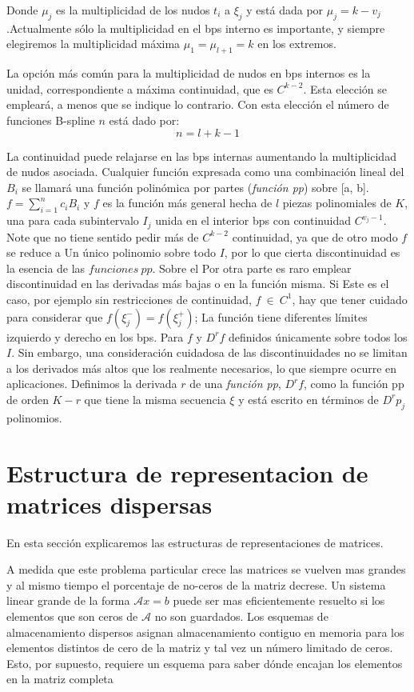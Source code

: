 \documentclass[a4paper,openright,12pt, oneside]{book}
\begin{document}
Donde $ \mu_j $ es la multiplicidad de los nudos $ t_i $ a $ \xi_j $ y est\'a dada por $ \mu_j = k - v_j $ .Actualmente s\'olo la multiplicidad en el bps interno es importante, y siempre elegiremos la multiplicidad m\'axima $ \mu_1 = \mu_ {l + 1} = k $ en los extremos.

La opci\'on m\'as com\'un para la multiplicidad de nudos en bps internos es la unidad, correspondiente a
m\'axima continuidad, que es $ C ^ {k-2} $. Esta elecci\'on se emplear\'a, a menos que se indique lo contrario. Con esta elecci\'on el n\'umero de funciones B-spline $n$ est\'a dado por:
$$ n = l + k - 1 $$

La continuidad puede relajarse en las bps internas aumentando la multiplicidad de nudos asociada.
Cualquier funci\'on expresada como una combinaci\'on lineal del $B_i$ se llamar\'a una funci\'on polin\'omica por partes (\textit{funci\'on pp}) sobre [a, b].
$f = \sum_{i=1}^n c_i B_i$
y $ f $ es la funci\'on m\'as general hecha de $l$ piezas polinomiales de
$ K $, una para cada subintervalo $ I_j $ unida en el interior bps con continuidad $ C ^ {v_j-1} $. Note que no tiene sentido pedir m\'as de $ C ^ {k-2} $ continuidad, ya que de otro modo $f$ se reduce a
Un \'unico polinomio sobre todo $I$, por lo que cierta discontinuidad es la esencia de las $funciones\ pp$. Sobre el
Por otra parte es raro emplear discontinuidad en las derivadas m\'as bajas o en la funci\'on misma. Si
Este es el caso, por ejemplo sin restricciones de continuidad, $ f\ \in\ C^1 $, hay que tener cuidado para 
considerar que $ f (\xi ^ {-} _ j) = f (\xi^{+}_j) $; La funci\'on tiene diferentes l\'imites izquierdo y derecho en 
los bps. Para $f$ y $D^rf$ definidos \'unicamente sobre todos los $ I $. Sin embargo, una consideraci\'on cuidadosa 
de las discontinuidades no se limitan a los derivados m\'as altos que los realmente necesarios, lo que siempre 
ocurre en aplicaciones. Definimos la derivada $r$ de una \textit{funci\'on pp}, $ D ^ {r} f $, como la funci\'on pp de orden
$ K - r $ que tiene la misma secuencia $ \xi $ y est\'a escrito en t\'erminos de $ D^{r}p_{j} $ polinomios.


\section{Estructura de representacion de matrices dispersas}

En esta secci\'on explicaremos las estructuras de representaciones de matrices.

A medida que este problema particular crece las matrices se vuelven mas grandes y al mismo tiempo el porcentaje de no-ceros de la matriz decrese.
Un sistema linear grande de la forma $\mathcal{A}x = b$ puede ser mas eficientemente resuelto si los elementos que son ceros de $\mathcal{A}$ no son guardados. Los esquemas de almacenamiento dispersos asignan almacenamiento contiguo en memoria para los elementos distintos de cero de la matriz y tal vez un n\'umero limitado de ceros. Esto, por supuesto, requiere un esquema para saber d\'onde encajan los elementos en la matriz completa
\end{document}
